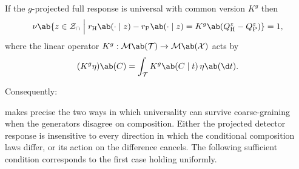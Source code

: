 \documentclass[12pt]{article}
\newcommand{\Herwig}{\mathrm{H}}
\newcommand{\Pythia}{\mathrm{P}}
\newcommand{\Gens}{\mathcal{S}}
\newcommand{\Sgn}{\mathcal{M}}
\newcommand{\supp}{\mathcal{Z}_{\cap}}
\newcommand{\1}{\mathbbm{1}}
\renewcommand{\[}{\begin{equation}}
\renewcommand{\]}{\end{equation}}
\begin{document}
    \begin{theorem}
    \label{thm:coarse}
        If the \(g\)-projected full response is universal with common version \(K^g\) then
        \[
        \label{eq:kernel-difference}
            \nu \ab\{ z\in\supp \;\Big|\; r_\Herwig \ab(\cdot \mid z) - r_\Pythia \ab(\cdot \mid z) = K^g \ab(Q_\Herwig^z - Q_\Pythia^z)\} = 1,
        \]
        where the linear operator \(K^g : \Sgn \ab(\mathcal{T}) \to \Sgn \ab(\mathcal{X})\) acts by
        \[
            (K^g \eta) \ab(C) = \int_{\mathcal{T}} K^g \ab(C \mid t)\,\eta \ab(\d t).
        \]
        
        Consequently:
    \end{theorem}

     makes precise the two ways in which universality can survive coarse-graining when the generators disagree on composition.
    Either the projected detector response is insensitive to every direction in which the conditional composition laws differ, or its action on the difference cancels.
    The following sufficient condition corresponds to the first case holding uniformly.
\end{document}
